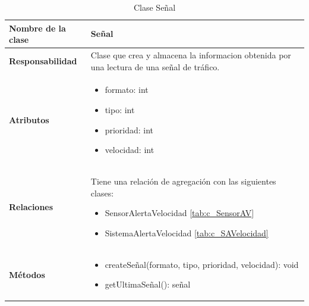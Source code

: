 \begin{table}[h]
\begin{center}
\begin{tabular}{p{} p{11cm}}
\textbf{Nombre de la clase} &  Señal\\ \hline \hline
\textbf{Responsabilidad} &  Clase que crea y almacena la informacion obtenida por una lectura de una señal de tráfico. \\ \hline
\textbf{Atributos} & \begin{itemize}
                      \item formato: int
                      \item tipo: int
                      \item prioridad: int
                      \item velocidad: int

                    \end{itemize}\\ \hline
\textbf{Relaciones} &

                      \par Tiene una relación de agregación con las siguientes clases:
                      \begin{itemize}
                        \item SensorAlertaVelocidad \ref{tab:c_SensorAV}
                        \item SistemaAlertaVelocidad \ref{tab:c_SAVelocidad}
                      \end{itemize}



                      \\ \hline

\textbf{Métodos} &  \begin{itemize}
                      \item createSeñal(formato, tipo, prioridad, velocidad): void
                      \item getUltimaSeñal(): señal
                    \end{itemize}\\ \hline
\end{tabular}
\caption{Clase Señal}
\label{tab:c_senal}
\end{center}
\end{table}










